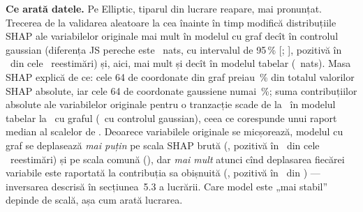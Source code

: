 %
{\textbf{Ce arată datele.} Pe Elliptic, tiparul din lucrare reapare, mai pronunțat. Trecerea de la validarea aleatoare la cea înainte în timp modifică distribuțiile SHAP ale variabilelor originale mai mult în modelul cu graf decît în controlul gaussian (diferența JS pereche este \NjsGC\ nats, cu intervalul de 95\,\% [\NjsGClo; \NjsGChi], pozitivă în \NjsGCpos\ din cele \NnSeeds\ reestimări) și, aici, mai mult și decît în modelul tabelar (\NjsGB\ nats).
Masa SHAP explică de ce: cele 64 de coordonate din graf preiau \NmassG\,\% din totalul valorilor SHAP absolute, iar cele 64 de coordonate gaussiene numai \NmassC\,\%; suma contribuțiilor absolute ale variabilelor originale pentru o tranzacție scade de la \NsumB\ în modelul tabelar la \NsumG\ cu graful (\NsumC\ cu controlul gaussian), ceea ce corespunde unui raport median al scalelor de \NratioG.
Deoarece variabilele originale se micșorează, modelul cu graf se deplasează \emph{mai puțin} pe scala SHAP brută (\NwRaw, pozitivă în \NwRawPos\ din cele \NnSeeds\ reestimări) și pe scala comună (\NwCom), dar \emph{mai mult} atunci cînd deplasarea fiecărei variabile este raportată la contribuția sa obișnuită (\NwOwn, pozitivă în \NwOwnPos\ din \NnSeeds) --- inversarea descrisă în secțiunea~5.3 a lucrării. Care model este „mai stabil” depinde de scală, așa cum arată lucrarea.}

